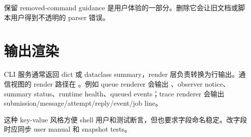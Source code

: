 保留 removed-command guidance 是用户体验的一部分。删除它会让旧文档或脚本用户得到不透明的 parser 错误。

\section{输出渲染}

CLI 服务通常返回 dict 或 dataclass summary，render 层负责转换为行输出。通信视图的 render 路径在 。例如 queue renderer 会输出 、observer notice、summary status、runtime health、queued events；trace renderer 会输出 submission/message/attempt/reply/event/job line。

这种 key-value 风格方便 shell 用户和测试断言，但也要求字段命名稳定。改字段时应同步 user manual 和 snapshot tests。
